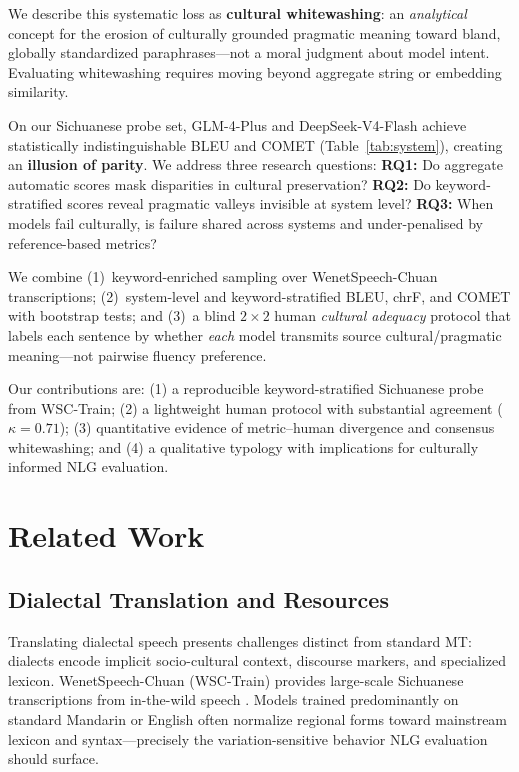 \documentclass[11pt]{article}
\begin{document}
We describe this systematic loss as \textbf{cultural whitewashing}: an \emph{analytical} concept for the erosion of culturally grounded pragmatic meaning toward bland, globally standardized paraphrases---not a moral judgment about model intent.
Evaluating whitewashing requires moving beyond aggregate string or embedding similarity.

On our Sichuanese probe set, GLM-4-Plus and DeepSeek-V4-Flash achieve statistically indistinguishable BLEU and COMET (Table~\ref{tab:system}), creating an \textbf{illusion of parity}.
We address three research questions:
\textbf{RQ1:} Do aggregate automatic scores mask disparities in cultural preservation?
\textbf{RQ2:} Do keyword-stratified scores reveal pragmatic valleys invisible at system level?
\textbf{RQ3:} When models fail culturally, is failure shared across systems and under-penalised by reference-based metrics?

We combine (1)~keyword-enriched sampling over WenetSpeech-Chuan transcriptions;
(2)~system-level and keyword-stratified BLEU, chrF, and COMET with bootstrap tests;
and (3)~a blind $2{\times}2$ human \emph{cultural adequacy} protocol that labels each sentence by whether \emph{each} model transmits source cultural/pragmatic meaning---not pairwise fluency preference.

Our contributions are:
(1) a reproducible keyword-stratified Sichuanese probe from WSC-Train;
(2) a lightweight human protocol with substantial agreement ($\kappa=0.71$);
(3) quantitative evidence of metric--human divergence and consensus whitewashing; and
(4) a qualitative typology with implications for culturally informed NLG evaluation.

\section{Related Work}

\subsection{Dialectal Translation and Resources}
Translating dialectal speech presents challenges distinct from standard MT: dialects encode implicit socio-cultural context, discourse markers, and specialized lexicon.
WenetSpeech-Chuan (WSC-Train) provides large-scale Sichuanese transcriptions from in-the-wild speech \cite{wenetspeech-chuan}.
Models trained predominantly on standard Mandarin or English often normalize regional forms toward mainstream lexicon and syntax---precisely the variation-sensitive behavior NLG evaluation should surface.
\end{document}
